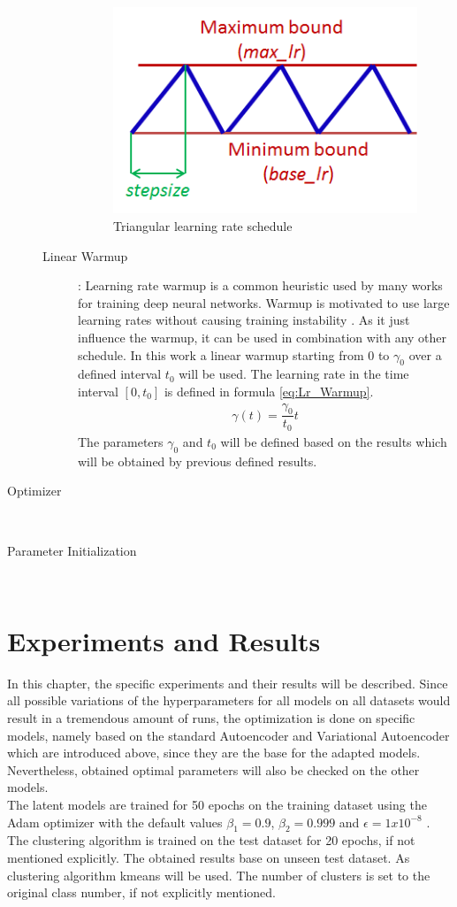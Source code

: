 \documentclass[12pt,DIV14,BCOR12mm,a4paper,footexclude,headinclude,halfparskip-,twoside,openright,openany,cleardoubleempty,idxtotoc,bibtotoc]{scrreprt} %
\numberwithin{equation}{chapter}
\begin{document}
\begin{description}
\begin{description}
		\begin{figure}[htb!]
			\centering
			\includegraphics[width=0.3\linewidth]{Graphiken/triangularWindow}
			\caption{Triangular learning rate schedule \cite{Smith15CyclicLearningRate}}
			\label{fig:Triangular Learning rate}
		\end{figure}
		\item[Linear Warmup]: Learning rate warmup is a common heuristic used by many works for training deep neural networks. Warmup is motivated to use large learning rates without causing training instability \cite{gotmare2018Warmup}. As it just influence the warmup, it can be used in combination with any other schedule. In this work a linear warmup starting from $0$ to $\gamma_0$ over a defined interval $t_0$ will be used. The learning rate in the time interval $[0, t_0]$ is defined in formula \ref{eq:Lr_Warmup}.
		\begin{align}
			\gamma(t) = \dfrac{\gamma_0}{t_0}t\label{eq:Lr_Warmup}
		\end{align}
		The parameters $\gamma_0$ and $t_0$ will be defined based on the results which will be obtained by previous defined results.
	\end{description}
	\item[Optimizer]\hfill \\
	\item[Parameter Initialization]\hfill \\
\end{description}
\chapter{Experiments and Results}
In this chapter, the specific experiments and their results will be described. Since all possible variations of the hyperparameters for all models on all datasets would result in a tremendous amount of runs, the optimization is done on specific models, namely based on the standard Autoencoder and Variational Autoencoder which are introduced above, since they are the base for the adapted models. Nevertheless, obtained optimal parameters will also be checked on the other models.\\
The latent models are trained for 50 epochs on the training dataset using the Adam optimizer with the default values $\beta_1=0.9$, $\beta_2=0.999$ and $\epsilon = 1x10^{-8}$ \cite{Kingma14AdamOptimizer}. The clustering algorithm is trained on the test dataset for 20 epochs, if not mentioned explicitly. The obtained results base on unseen test dataset. As clustering algorithm kmeans will be used. The number of clusters is set to the original class number, if not explicitly mentioned.\\
\end{document}
